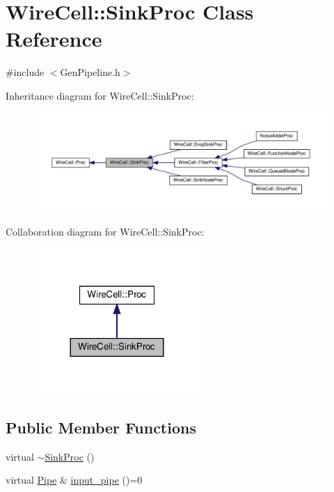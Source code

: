 \hypertarget{class_wire_cell_1_1_sink_proc}{}\section{Wire\+Cell\+:\+:Sink\+Proc Class Reference}
\label{class_wire_cell_1_1_sink_proc}


{\ttfamily \#include $<$Gen\+Pipeline.\+h$>$}



Inheritance diagram for Wire\+Cell\+:\+:Sink\+Proc\+:
\nopagebreak
\begin{figure}[H]
\begin{center}
\leavevmode
\includegraphics[width=350pt]{class_wire_cell_1_1_sink_proc__inherit__graph}
\end{center}
\end{figure}


Collaboration diagram for Wire\+Cell\+:\+:Sink\+Proc\+:
\nopagebreak
\begin{figure}[H]
\begin{center}
\leavevmode
\includegraphics[width=180pt]{class_wire_cell_1_1_sink_proc__coll__graph}
\end{center}
\end{figure}
\subsection*{Public Member Functions}
\begin{DoxyCompactItemize}
\item 
virtual \hyperlink{class_wire_cell_1_1_sink_proc_a8fa90973d4a178be7ce257b6c13c6e1c}{$\sim$\+Sink\+Proc} ()
\item 
virtual \hyperlink{namespace_wire_cell_afce9bb01c731347c3d4c8ca9d4ed804f}{Pipe} \& \hyperlink{class_wire_cell_1_1_sink_proc_a47ec8c790457ad63e9d0bb9b1b7da935}{input\+\_\+pipe} ()=0
\end{DoxyCompactItemize}


